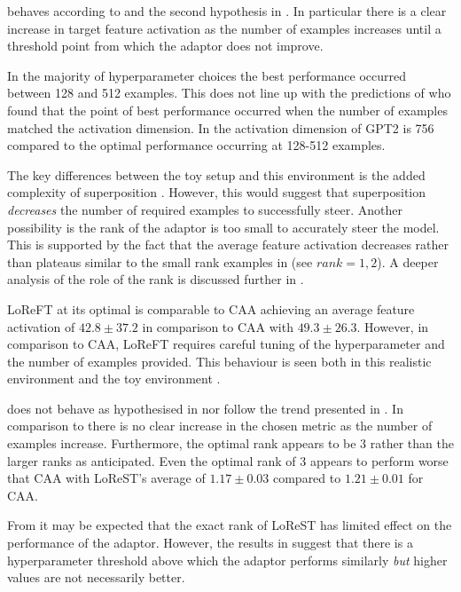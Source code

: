  behaves according to \citet{steering-clear} and the second hypothesis in . In particular there is a clear increase in target feature activation as the number of examples increases until a threshold point from which the adaptor does not improve.

In the majority of hyperparameter choices the best performance occurred between 128 and 512 examples.
This does not line up with the predictions of \citet{steering-clear} who found that the point of best performance occurred when the number of examples matched the activation dimension.
In  the activation dimension of GPT2 is 756 \citep{saelens} compared to the optimal performance occurring at 128-512 examples.

The key differences between the toy setup and this environment is the added complexity of superposition .
However, this would suggest that superposition \emph{decreases} the number of required examples to successfully steer.
Another possibility is the rank of the adaptor is too small to accurately steer the model.
This is supported by the fact that the average feature activation decreases rather than plateaus similar to the small rank examples in  (see $rank=1, 2$).
A deeper analysis of the role of the rank is discussed further in .

LoReFT at its optimal is comparable to CAA achieving an average feature activation of $42.8 \pm 37.2$ in comparison to CAA with $49.3 \pm 26.3$.
However, in comparison to CAA, LoReFT requires careful tuning of the hyperparameter and the number of examples provided.
This behaviour is seen both in this realistic environment and the toy environment .

 does not behave as hypothesised in  nor follow the trend presented in \citet{steering-clear}.
In comparison to  there is no clear increase in the chosen metric as the number of examples increase.
Furthermore, the optimal rank appears to be $3$ rather than the larger ranks as anticipated.
Even the optimal rank of $3$ appears to perform worse that CAA with LoReST's average of $1.17 \pm 0.03$ compared to $1.21 \pm 0.01$ for CAA.

From  it may be expected that the exact rank of LoReST has limited effect on the performance of the adaptor.
However, the results in  suggest that there is a hyperparameter threshold above which the adaptor performs similarly \emph{but} higher values are not necessarily better.

